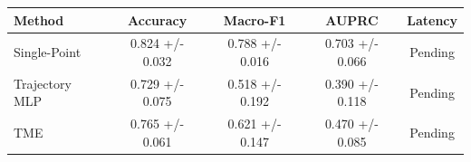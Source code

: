 \begin{tabular}{lcccc}
\toprule
Method & Accuracy & Macro-F1 & AUPRC & Latency \\
\midrule
Single-Point & 0.824 +/- 0.032 & 0.788 +/- 0.016 & 0.703 +/- 0.066 & Pending \\
Trajectory MLP & 0.729 +/- 0.075 & 0.518 +/- 0.192 & 0.390 +/- 0.118 & Pending \\
TME & 0.765 +/- 0.061 & 0.621 +/- 0.147 & 0.470 +/- 0.085 & Pending \\
\bottomrule
\end{tabular}

